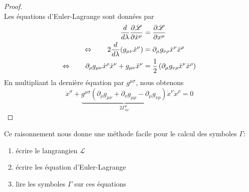 \documentclass[a4paper,11pt]{report}
\theoremstyle{definition}
\theoremstyle{plain}
\theoremstyle{definition}
\theoremstyle{remark}
\newcommand{\p}{\partial}
\begin{document}
            \begin{proof}${}$\\
                Les équations d'Euler-Lagrange sont données par
                \begin{align}
                    \frac{d}{d\lambda}\pdv{\mathscr{L}}{\dot{x}^\mu} &= \pdv{\mathscr{L}}{x^\mu}\\
                    \Leftrightarrow\qquad 2\frac{d}{d\lambda}(g_{\mu\nu}\dot{x}^\nu) &= \p_\mu g_{\nu\rho}\dot{x}^\nu\dot{x}^\rho\\
                    \Leftrightarrow\qquad \p_\rho g_{\mu\nu}\dot{x}^\rho\dot{x}^\nu + g_{\mu\nu}\ddot{x}^\nu &= \frac{1}{2}\left( \p_\mu g_{\nu\rho}\dot{x}^\nu\dot{x}^\rho \right)
                \end{align}
                En multipliant la dernière équation par $g^{\mu\sigma}$, nous obtenons
                \begin{equation}
                    \ddot{x}^\sigma + \underbrace{g^{\mu\sigma}\left( \p_\rho g_{\mu\nu}+\p_\nu g_{\mu\rho} - \p_\mu g_{\nu\rho} \right)}_{2\Gamma^\sigma_{\nu\rho}}\dot{x}^\nu\dot{x}^\rho = 0\label{eq:calculgamma}
                \end{equation}
            \end{proof}
            
            Ce raisonnement nous donne une méthode facile pour le calcul des symboles $\Gamma$:
            \begin{enumerate}
                \item écrire le langrangien $\mathscr{L}$
                \item écrire les équation d'Euler-Lagrange
                \item lire les symboles $\Gamma$ sur ces équations
            \end{enumerate}
            
\end{document}
